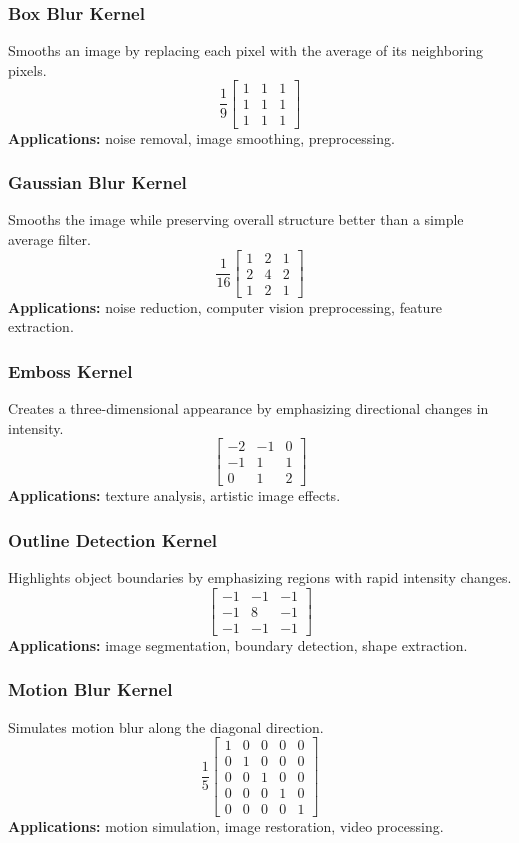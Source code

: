 \documentclass[11pt]{article}
\begin{document}
\subsubsection*{Box Blur Kernel}
Smooths an image by replacing each pixel with the average of its neighboring pixels.
\[
\frac{1}{9}
\begin{bmatrix}
1 & 1 & 1\\
1 & 1 & 1\\
1 & 1 & 1
\end{bmatrix}
\]
\textbf{Applications:} noise removal, image smoothing, preprocessing.

\subsubsection*{Gaussian Blur Kernel}
Smooths the image while preserving overall structure better than a simple average filter.
\[
\frac{1}{16}
\begin{bmatrix}
1 & 2 & 1\\
2 & 4 & 2\\
1 & 2 & 1
\end{bmatrix}
\]
\textbf{Applications:} noise reduction, computer vision preprocessing, feature extraction.

\subsubsection*{Emboss Kernel}
Creates a three-dimensional appearance by emphasizing directional changes in intensity.
\[
\begin{bmatrix}
-2 & -1 & 0\\
-1 & 1 & 1\\
0 & 1 & 2
\end{bmatrix}
\]
\textbf{Applications:} texture analysis, artistic image effects.

\subsubsection*{Outline Detection Kernel}
Highlights object boundaries by emphasizing regions with rapid intensity changes.
\[
\begin{bmatrix}
-1 & -1 & -1\\
-1 & 8 & -1\\
-1 & -1 & -1
\end{bmatrix}
\]
\textbf{Applications:} image segmentation, boundary detection, shape extraction.

\subsubsection*{Motion Blur Kernel}
Simulates motion blur along the diagonal direction.
\[
\frac{1}{5}
\begin{bmatrix}
1 & 0 & 0 & 0 & 0\\
0 & 1 & 0 & 0 & 0\\
0 & 0 & 1 & 0 & 0\\
0 & 0 & 0 & 1 & 0\\
0 & 0 & 0 & 0 & 1
\end{bmatrix}
\]
\textbf{Applications:} motion simulation, image restoration, video processing.
\end{document}
